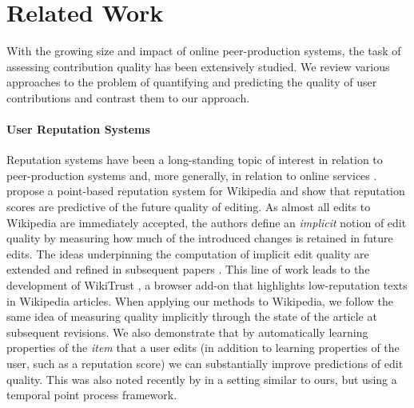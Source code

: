 \section{Related Work}
\label{sec:relwork}

With the growing size and impact of online peer-production systems, the task of assessing contribution quality has been extensively studied.
We review various approaches to the problem of quantifying and predicting the quality of user contributions and contrast them to our approach.

\paragraph{User Reputation Systems}
Reputation systems have been a long-standing topic of interest in relation to peer-production systems and, more generally, in relation to online services \citep{resnick2000reputation}.
\citet{adler2007content} propose a point-based reputation system for Wikipedia and show that reputation scores are predictive of the future quality of editing.
As almost all edits to Wikipedia are immediately accepted, the authors define an \emph{implicit} notion of edit quality by measuring how much of the introduced changes is retained in future edits.
The ideas underpinning the computation of implicit edit quality are extended and refined in subsequent papers \citep{adler2008measuring, dealfaro2013content}.
This line of work leads to the development of WikiTrust \citep{dealfaro2011reputation}, a browser add-on that highlights low-reputation texts in Wikipedia articles.
When applying our methods to Wikipedia, we follow the same idea of measuring quality implicitly through the state of the article at subsequent revisions.
We also demonstrate that by automatically learning properties of the \emph{item} that a user edits (in addition to learning properties of the user, such as a reputation score) we can substantially improve predictions of edit quality.
This was also noted recently by \citet{tabibian2017distilling} in a setting similar to ours, but using a temporal point process framework.

